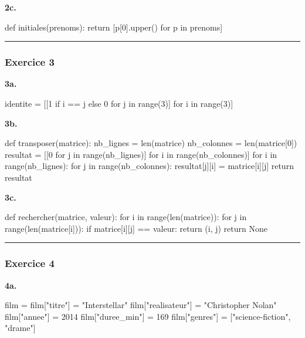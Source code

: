 \textbf{2c.}

\begin{python}
def initiales(prenoms):
    return [p[0].upper() for p in prenoms]
\end{python}

\begin{center}\rule{0.5\linewidth}{0.5pt}\end{center}

\subsubsection{Exercice 3}

\textbf{3a.}

\begin{python}
identite = [[1 if i == j else 0 for j in range(3)] for i in range(3)]
\end{python}

\textbf{3b.}

\begin{python}
def transposer(matrice):
    nb_lignes = len(matrice)
    nb_colonnes = len(matrice[0])
    resultat = [[0 for j in range(nb_lignes)] for i in range(nb_colonnes)]
    for i in range(nb_lignes):
        for j in range(nb_colonnes):
            resultat[j][i] = matrice[i][j]
    return resultat
\end{python}

\textbf{3c.}

\begin{python}
def rechercher(matrice, valeur):
    for i in range(len(matrice)):
        for j in range(len(matrice[i])):
            if matrice[i][j] == valeur:
                return (i, j)
    return None
\end{python}

\begin{center}\rule{0.5\linewidth}{0.5pt}\end{center}

\subsubsection{Exercice 4}

\textbf{4a.}

\begin{python}
film = {}
film["titre"] = "Interstellar"
film["realisateur"] = "Christopher Nolan"
film["annee"] = 2014
film["duree_min"] = 169
film["genres"] = ["science-fiction", "drame"]
\end{python}

